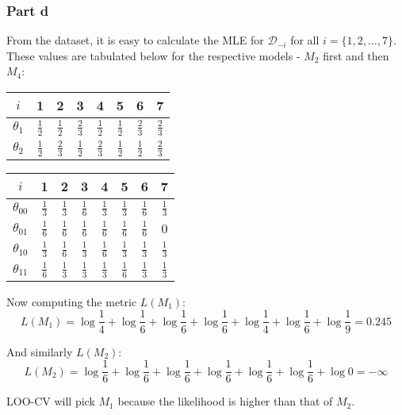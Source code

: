 \documentclass{article}
\begin{document}
\subsubsection*{Part d}
\begin{flushleft}
From the dataset, it is easy to calculate the MLE for \(\mathcal{D}_{-i}\) for all \(i = \{1, 2, \ldots, 7\}\). These values are tabulated below for the respective models - \(M_{2}\) first and then \(M_{4}\):
\begin{center}
\begin{tabular}{c|ccccccc}
\(i\) & 1 & 2 & 3 & 4 & 5 & 6 & 7 \\
\hline
\(\theta_{1}\) & \(\frac{1}{2}\) & \(\frac{1}{2}\) & \(\frac{2}{3}\) & \(\frac{1}{2}\) & \(\frac{1}{2}\) & \(\frac{2}{3}\) & \(\frac{2}{3}\) \\
\(\theta_{2}\) & \(\frac{1}{2}\) & \(\frac{2}{3}\) & \(\frac{1}{2}\) & \(\frac{2}{3}\) & \(\frac{1}{2}\) & \(\frac{1}{2}\) & \(\frac{2}{3}\) \\
\end{tabular}
\end{center}

\begin{center}
\begin{tabular}{c|ccccccc}
\(i\) & 1 & 2 & 3 & 4 & 5 & 6 & 7 \\
\hline
\(\theta_{00}\) & \(\frac{1}{3}\) & \(\frac{1}{3}\) & \(\frac{1}{6}\) & \(\frac{1}{3}\) & \(\frac{1}{3}\) & \(\frac{1}{6}\) & \(\frac{1}{3}\) \\
\(\theta_{01}\) & \(\frac{1}{6}\) & \(\frac{1}{6}\) & \(\frac{1}{6}\) & \(\frac{1}{6}\) & \(\frac{1}{6}\) & \(\frac{1}{6}\) & \(0\) \\
\(\theta_{10}\) & \(\frac{1}{3}\) & \(\frac{1}{6}\) & \(\frac{1}{3}\) & \(\frac{1}{6}\) & \(\frac{1}{3}\) & \(\frac{1}{3}\) & \(\frac{1}{3}\) \\
\(\theta_{11}\) & \(\frac{1}{6}\) & \(\frac{1}{3}\) & \(\frac{1}{3}\) & \(\frac{1}{3}\) & \(\frac{1}{6}\) & \(\frac{1}{3}\) & \(\frac{1}{3}\) \\
\end{tabular}
\end{center}

Now computing the metric \(L(M_{1})\):
\begin{equation}
L(M_{1}) = \log\frac{1}{4} + \log\frac{1}{6} + \log\frac{1}{6} + \log\frac{1}{6} + \log\frac{1}{4} + \log\frac{1}{6} + \log\frac{1}{9} = 0.245
\end{equation}

And similarly \(L(M_{2})\):
\begin{equation}
L(M_{2}) = \log\frac{1}{6} + \log\frac{1}{6} + \log\frac{1}{6} + \log\frac{1}{6} + \log\frac{1}{6} + \log\frac{1}{6} + \log 0 = -\infty
\end{equation}

LOO-CV will pick \(M_{1}\) because the likelihood is higher than that of \(M_{2}\).
\end{flushleft}
\end{document}
